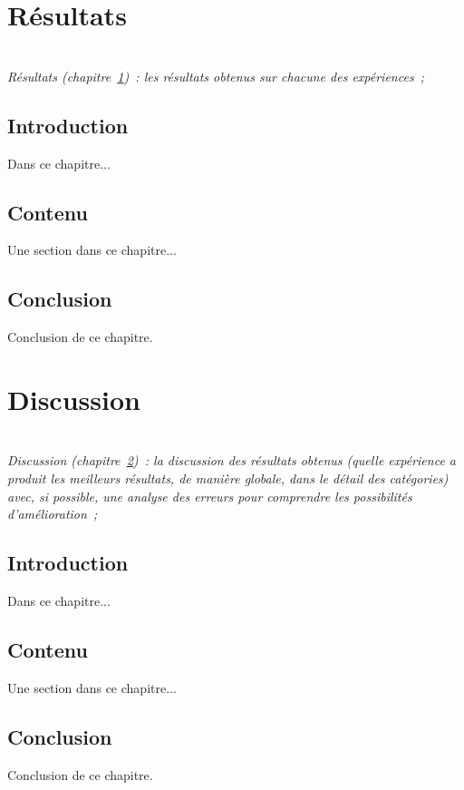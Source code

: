 \documentclass[a4paper,11pt,twoside]{memoir}
\begin{document}
\chapter{Résultats}
\label{chap:resultats}
\minitoc

\textit{\\Résultats (chapitre~\ref{chap:resultats})~: les résultats
obtenus sur chacune des expériences~;}

\section{Introduction}
Dans ce chapitre...

\section{Contenu}
Une section dans ce chapitre...

\section{Conclusion}
Conclusion de ce chapitre.



\chapter{Discussion}
\label{chap:discussion}
\minitoc

\textit{\\Discussion (chapitre~\ref{chap:discussion})~: la discussion des
résultats obtenus (quelle expérience a produit les meilleurs
résultats, de manière globale, dans le détail des catégories) avec,
si possible, une analyse des erreurs pour comprendre les
possibilités d'amélioration~;}

\section{Introduction}
Dans ce chapitre...

\section{Contenu}
Une section dans ce chapitre...

\section{Conclusion}
Conclusion de ce chapitre.
\end{document}
